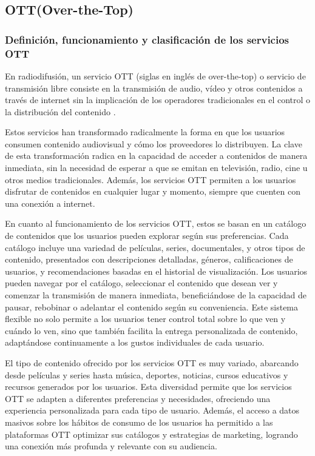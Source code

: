 \subsection{OTT(Over-the-Top)}
\label{sec:fundamentos_teoricos_ott}

\subsubsection{Definición, funcionamiento y clasificación de los servicios OTT}
\label{sec:ott_definicion_funcionamiento_clasificacion}
En radiodifusión, un servicio OTT (siglas en inglés de over-the-top) o servicio de transmisión 
libre consiste en la transmisión de audio, vídeo y otros contenidos a través de internet sin la 
implicación de los operadores tradicionales en el control o la distribución del contenido \cite{OTT}.

Estos servicios han transformado radicalmente la forma en que los usuarios consumen contenido 
audiovisual y cómo los proveedores lo distribuyen. La clave de esta transformación radica en 
la capacidad de acceder a contenidos de manera inmediata, sin la necesidad de esperar a que se 
emitan en televisión, radio, cine u otros medios tradicionales. Además, los servicios OTT permiten 
a los usuarios disfrutar de contenidos en cualquier lugar y momento, siempre que cuenten con una 
conexión a internet.

En cuanto al funcionamiento de los servicios OTT, estos se basan en un catálogo de contenidos que 
los usuarios pueden explorar según sus preferencias. Cada catálogo incluye una variedad de películas, 
series, documentales, y otros tipos de contenido, presentados con descripciones detalladas, géneros, 
calificaciones de usuarios, y recomendaciones basadas en el historial de visualización. Los usuarios 
pueden navegar por el catálogo, seleccionar el contenido que desean ver y comenzar la transmisión de 
manera inmediata, beneficiándose de la capacidad de pausar, rebobinar o adelantar el contenido según 
su conveniencia. Este sistema flexible no solo permite a los usuarios tener control total sobre lo que 
ven y cuándo lo ven, sino que también facilita la entrega personalizada de contenido, adaptándose 
continuamente a los gustos individuales de cada usuario.

El tipo de contenido ofrecido por los servicios OTT es muy variado, abarcando desde películas y series 
hasta música, deportes, noticias, cursos educativos y recursos generados por los usuarios. Esta diversidad 
permite que los servicios OTT se adapten a diferentes preferencias y necesidades, ofreciendo una experiencia 
personalizada para cada tipo de usuario. Además, el acceso a datos masivos sobre los hábitos de consumo 
de los usuarios ha permitido a las plataformas OTT optimizar sus catálogos y estrategias de marketing, 
logrando una conexión más profunda y relevante con su audiencia.

